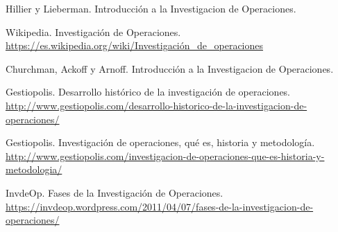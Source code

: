 \documentclass[12pt, a4paper,spanish]{article}
\begin{document}
	\begin{thebibliography}{9}


		Hillier y Lieberman. Introducción a la Investigacion de Operaciones.

		Wikipedia. Investigación de Operaciones. \\
		\url{https://es.wikipedia.org/wiki/Investigación_de_operaciones}

		Churchman, Ackoff y Arnoff. Introducción a la Investigacion de Operaciones.

		Gestiopolis. Desarrollo histórico de la investigación de operaciones. \\
		\url{http://www.gestiopolis.com/desarrollo-historico-de-la-investigacion-de-operaciones/}

		Gestiopolis. Investigación de operaciones, qué es, historia y metodología. \\
		\url{http://www.gestiopolis.com/investigacion-de-operaciones-que-es-historia-y-metodologia/}

		InvdeOp. Fases de la Investigación de Operaciones. \\
		\url{https://invdeop.wordpress.com/2011/04/07/fases-de-la-investigacion-de-operaciones/}

	\end{thebibliography}
\end{document}
